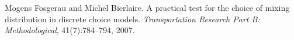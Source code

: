 
\begin{DoxyDescription}
\item[\label{_CITEREF_FosgBier07}%
\mbox{[}1\mbox{]}]Mogens Fosgerau and Michel Bierlaire. A practical test for the choice of mixing distribution in discrete choice models. {\itshape Transportation Research Part B\+: Methodological}, 41(7)\+:784--794, 2007. 


\end{DoxyDescription}